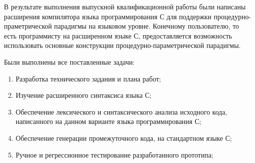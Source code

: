 В результате выполнения выпускной квалификационной работы были написаны расширения компилятора языка программирования С для поддержки процедурно-праметрической парадигмы на языковом уровне.
Конечному пользователю, то есть программисту на расширенном языке С, предоставляется возможность использовать основные конструкции процедурно-параметрической парадигмы.

Были выполнены все поставленные задачи:

\begin{enumerate}
  \item Разработка технического задания и плана работ;
  \item Изучение расширенного синтаксиса языка С;
  \item Обеспечение лексического и синтаксического анализа исходного кода, написанного на данном варианте языка программирования С;
  \item Обеспечение генерации промежуточного кода, на стандартном языке С;
  \item Ручное и регрессионное тестирование разработанного прототипа;
\end{enumerate}
